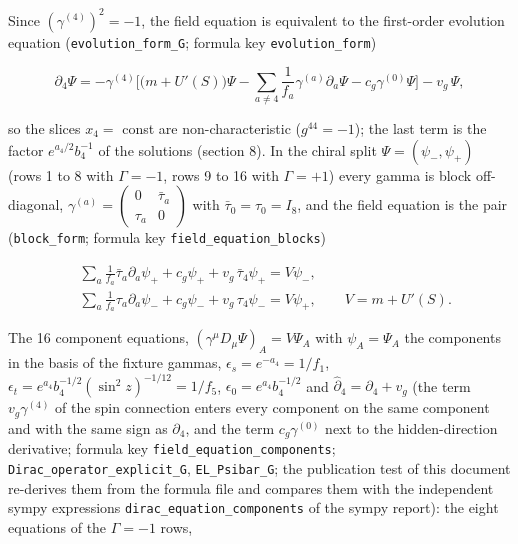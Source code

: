 \documentclass[11pt]{article}
\begin{document}
Since $(\gamma^{(4)})^2 = -1$, the field equation is equivalent to the first-order evolution equation (\texttt{evolutio\allowbreak{}n\_form\_G}; formula key \texttt{evolutio\allowbreak{}n\_form})

\[
\partial_4\Psi = -\gamma^{(4)}\Big[\big(m + U'(S)\big)\Psi - \sum_{a \neq 4}\frac{1}{f_a}\gamma^{(a)}\partial_a\Psi - c_g\gamma^{(0)}\Psi\Big] - v_g\,\Psi,
\]

so the slices $x_4 = $ const are non-characteristic ($g^{44} = -1$); the last term is the factor $e^{a_4/2}b_4^{-1}$ of the solutions (section 8). In the chiral split $\Psi = (\psi_-, \psi_+)$ (rows 1 to 8 with $\Gamma = -1$, rows 9 to 16 with $\Gamma = +1$) every gamma is block off-diagonal, $\gamma^{(a)} = \begin{pmatrix} 0 & \bar\tau_a \\ \tau_a & 0\end{pmatrix}$ with $\bar\tau_0 = \tau_0 = I_8$, and the field equation is the pair (\texttt{block\_fo\allowbreak{}rm}; formula key \texttt{field\_eq\allowbreak{}uation\_b\allowbreak{}locks})

\[
\begin{aligned}
&\sum_{a}\frac{1}{f_a}\bar\tau_a\partial_a\psi_+ + c_g\psi_+ + v_g\,\bar\tau_4\psi_+ = V\psi_-,\\
&\sum_{a}\frac{1}{f_a}\tau_a\partial_a\psi_- + c_g\psi_- + v_g\,\tau_4\psi_- = V\psi_+,\qquad V = m + U'(S).
\end{aligned}
\]

The 16 component equations, $(\gamma^\mu D_\mu\Psi)_A = V\Psi_A$ with $\psi_A = \Psi_A$ the components in the basis of the fixture gammas, $\epsilon_s = e^{-a_4} = 1/f_1$, $\epsilon_t = e^{a_4}b_4^{-1/2}(\sin^2 z)^{-1/12} = 1/f_5$, $\epsilon_0 = e^{a_4}b_4^{-1/2}$ and $\hat\partial_4 = \partial_4 + v_g$ (the term $v_g\gamma^{(4)}$ of the spin connection enters every component on the same component and with the same sign as $\partial_4$, and the term $c_g\gamma^{(0)}$ next to the hidden-direction derivative; formula key \texttt{field\_eq\allowbreak{}uation\_c\allowbreak{}omponent\allowbreak{}s}; \texttt{Dirac\_op\allowbreak{}erator\_e\allowbreak{}xplicit\_\allowbreak{}G}, \texttt{EL\_Psiba\allowbreak{}r\_G}; the publication test of this document re-derives them from the formula file and compares them with the independent sympy expressions \texttt{dirac\_eq\allowbreak{}uation\_c\allowbreak{}omponent\allowbreak{}s} of the sympy report): the eight equations of the $\Gamma = -1$ rows,
\end{document}
